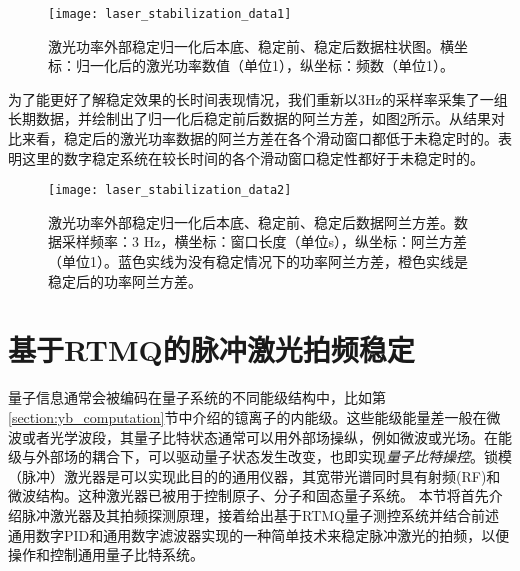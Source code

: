 \begin{figure}
    \centering
    \caption[激光功率外部稳定柱状图对比数据]{激光功率外部稳定归一化后本底、稳定前、稳定后数据柱状图。横坐标：归一化后的激光功率数值（单位1），纵坐标：频数（单位1）。\label{fig:laser_stabilization_data1}}
    \texttt{[image: laser\_stabilization\_data1]}
\end{figure}

为了能更好了解稳定效果的长时间表现情况，我们重新以3Hz的采样率采集了一组长期数据，并绘制出了归一化后稳定前后数据的阿兰方差，如图\ref{fig:laser_stabilization_data2}所示。从结果对比来看，稳定后的激光功率数据的阿兰方差在各个滑动窗口都低于未稳定时的。表明这里的数字稳定系统在较长时间的各个滑动窗口稳定性都好于未稳定时的。
\begin{figure}
    \centering
    \caption[激光功率外部稳定阿兰方差对比数据]{激光功率外部稳定归一化后本底、稳定前、稳定后数据阿兰方差。数据采样频率：3 Hz，横坐标：窗口长度（单位s），纵坐标：阿兰方差（单位1）。蓝色实线为没有稳定情况下的功率阿兰方差，橙色实线是稳定后的功率阿兰方差。\label{fig:laser_stabilization_data2}}
    \texttt{[image: laser\_stabilization\_data2]}
\end{figure}









\newpage
\section[基于RTMQ的脉冲激光拍频稳定]{基于RTMQ的脉冲激光拍频稳定\label{section:pulsed_laser_locking}}

量子信息通常会被编码在量子系统的不同能级结构中，比如第\ref{section:yb_computation}节中介绍的镱离子的内能级。这些能级能量差一般在微波或者光学波段，其量子比特状态通常可以用外部场操纵，例如微波或光场。在能级与外部场的耦合下，可以驱动量子状态发生改变，也即实现\emph{量子比特操控}。锁模（脉冲）激光器是可以实现此目的的通用仪器，其宽带光谱同时具有射频(RF)和微波结构。这种激光器已被用于控制原子\cite[]{Hayes_Matsukevich_Maunz_Hucul_Quraishi_Olmschenk_Campbell_Mizrahi_Senko_Monroe_2010}、分子\cite[]{Peer_Shapiro_Stowe_Shapiro_Ye_2007}和固态量子系统\cite[]{Greve_Press_McMahon_Yamamoto_2013}。
本节将首先介绍脉冲激光器及其拍频探测原理，接着给出基于RTMQ量子测控系统并结合前述通用数字PID和通用数字滤波器实现的一种简单技术来稳定脉冲激光的拍频，以便操作和控制通用量子比特系统\cite[]{ladd2010quantum}。


